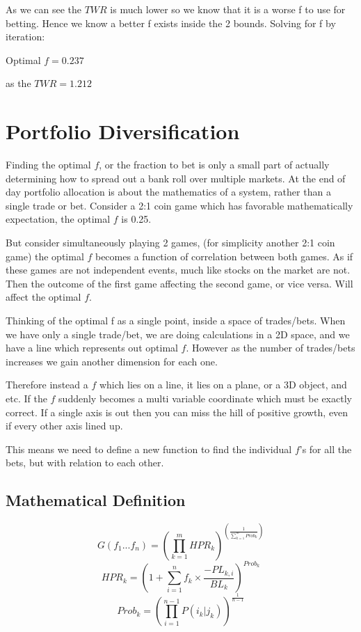 \documentclass[12pt]{article}
\begin{document}
    As we can see the \(TWR\) is much lower so we know that it is a worse f to use for betting. Hence
    we know a better f exists inside the 2 bounds. Solving for f by iteration:

    Optimal \(f = 0.237\)

    as the \(TWR = 1.212\)

\section{Portfolio Diversification}

    Finding the optimal \(f\), or the fraction to bet is only a small part of actually determining 
    how to spread out a bank roll over multiple markets. At the end of day portfolio allocation 
    is about the mathematics of a system, rather than a single trade or bet. Consider a 2:1
    coin game which has favorable mathematically expectation, the optimal \(f\) is 0.25.

    But consider simultaneously playing 2 games, {(for simplicity another 2:1 coin game)} the 
    optimal \(f\) becomes a function of correlation between both games. As if these games 
    are not independent events, much like stocks on the market are not. Then the outcome 
    of the first game affecting the second game, or vice versa. Will affect the optimal \(f\).

    Thinking of the optimal f as a single point, inside a space of trades/bets. When we have 
    only a single trade/bet, we are doing calculations in a 2D space, and we have a line which 
    represents out optimal \(f\). However as the number of trades/bets increases we gain
    another dimension for each one.

    Therefore instead a \(f\) which lies on a line, it lies on a plane, or a 3D object, 
    and etc. If the \(f\) suddenly becomes a multi variable coordinate which must be 
    exactly correct. If a single axis is out then you can miss the hill of positive 
    growth, even if every other axis lined up.

    This means we need to define a new function to find the individual \(f\)'s for all the bets,
    but with relation to each other.

\subsection{Mathematical Definition}

    \begin{equation}\label{eq:G}
        G(f_1...f_n) = \left( \displaystyle\prod^{m}_{k=1} HPR_k \right) ^{ \left( \displaystyle\frac{1}{\sum^{m}_{k=1}Prob_k} \right)}
    \end{equation}
    \begin{equation}\label{eq:HPR_k}
        HPR_k = \left( 1 +  \displaystyle\sum^{n}_{i=1} f_k \times \frac{- PL_{k,i}}{BL_k} \right) ^{Prob_k}
    \end{equation}
    \begin{equation}\label{eq:Prob_k}
        Prob_k = \left( \displaystyle\prod^{n - 1}_{i=1} P(i_k | j_k)\right)^{\frac{1}{n - 1}}
    \end{equation}
\end{document}
